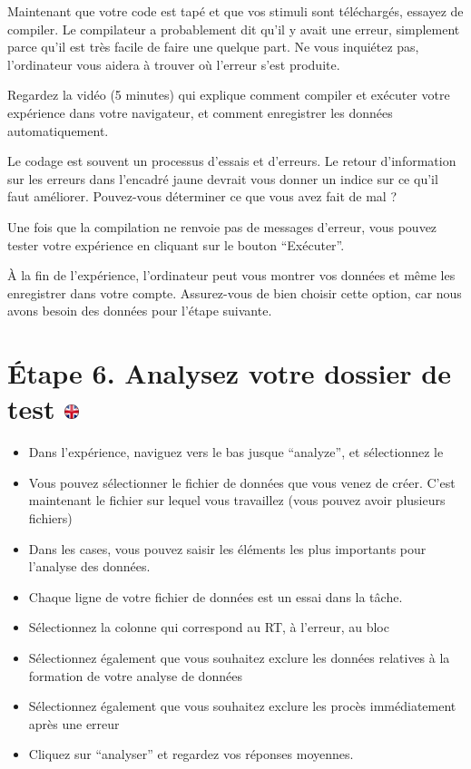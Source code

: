 \documentclass[
]{book}
\providecommand{\tightlist}{%
  \setlength{\itemsep}{0pt}\setlength{\parskip}{0pt}}
\begin{document}
Maintenant que votre code est tapé et que vos stimuli sont téléchargés,
essayez de compiler. Le compilateur a probablement dit qu'il y avait une
erreur, simplement parce qu'il est très facile de faire une quelque
part. Ne vous inquiétez pas, l'ordinateur vous aidera à trouver où
l'erreur s'est produite.

Regardez la vidéo (5 minutes) qui explique comment compiler et exécuter
votre expérience dans votre navigateur, et comment enregistrer les
données automatiquement.

Le codage est souvent un processus d'essais et d'erreurs. Le retour
d'information sur les erreurs dans l'encadré jaune devrait vous donner
un indice sur ce qu'il faut améliorer. Pouvez-vous déterminer ce que
vous avez fait de mal ?

Une fois que la compilation ne renvoie pas de messages d'erreur, vous
pouvez tester votre expérience en cliquant sur le bouton ``Exécuter''.

À la fin de l'expérience, l'ordinateur peut vous montrer vos données et
même les enregistrer dans votre compte. Assurez-vous de bien choisir
cette option, car nous avons besoin des données pour l'étape suivante.

\hypertarget{uxe9tape-6.-analysez-votre-dossier-de-test}{%
\section[Étape 6. Analysez votre dossier de test ]{\texorpdfstring{Étape
6. Analysez votre dossier de test
\href{https://www.psytoolkit.org/lessons/project.html\#_step_6_analyze_your_test_file}{\protect\includegraphics{img/ukflag.png}}}{Étape 6. Analysez votre dossier de test }}\label{uxe9tape-6.-analysez-votre-dossier-de-test}}

\begin{itemize}
\tightlist
\item
  Dans l'expérience, naviguez vers le bas jusque ``analyze'', et
  sélectionnez le
\item
  Vous pouvez sélectionner le fichier de données que vous venez de
  créer. C'est maintenant le fichier sur lequel vous travaillez (vous
  pouvez avoir plusieurs fichiers)
\item
  Dans les cases, vous pouvez saisir les éléments les plus importants
  pour l'analyse des données.
\item
  Chaque ligne de votre fichier de données est un essai dans la tâche.
\item
  Sélectionnez la colonne qui correspond au RT, à l'erreur, au bloc
\item
  Sélectionnez également que vous souhaitez exclure les données
  relatives à la formation de votre analyse de données
\item
  Sélectionnez également que vous souhaitez exclure les procès
  immédiatement après une erreur
\item
  Cliquez sur ``analyser'' et regardez vos réponses moyennes.
\end{itemize}
\end{document}
